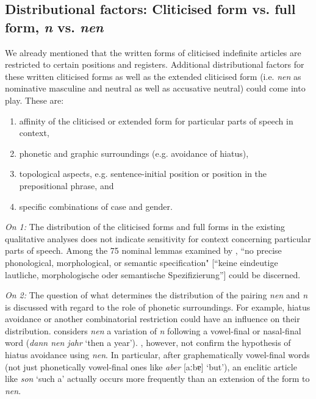 \subsection[Distributional factors]{Distributional factors: Cliticised form vs. full form, \textit{n} vs. \textit{nen}}
\label{subsec:14distributionalFactors}

We already mentioned that the written forms of cliticised indefinite articles are restricted to certain positions and registers.
Additional distributional factors for these written cliticised forms as well as the extended cliticised form (i.e. \textit{nen} as nominative masculine and neutral as well as accusative neutral) could come into play.
These are:

\begin{enumerate}
	\item affinity of the cliticised or extended form for particular parts of speech in context,
	\item phonetic and graphic surroundings (e.g. avoidance of hiatus),
	\item topological aspects, e.g. sentence-initial position or position in the prepositional phrase, and
	\item specific combinations of case and gender.
\end{enumerate}

\textit{On 1:}
The distribution of the cliticised forms and full forms in the existing qualitative analyses does not indicate sensitivity for context concerning particular parts of speech.
Among the 75 nominal lemmas examined by \citet[182]{Vogel2006}, ``no precise phonological, morphological, or semantic specification" [``keine eindeutige lautliche, morphologische oder semantische Spezifizierung''] could be discerned.

\textit{On 2:}
The question of what determines the distribution of the pairing \textit{nen} and \textit{n} is discussed with regard to the role of phonetic surroundings.
For example, hiatus avoidance or another combinatorial restriction could have an influence on their distribution.
\citet[7]{Burri2003} considers \textit{nen} a variation of \textit{n} following a vowel-final or nasal-final word (\textit{dann nen jahr} `then a year').
\citet[185]{Vogel2006}, however, not confirm the hypothesis of hiatus avoidance using \textit{nen}.
In particular, after graphematically vowel-final words (not just phonetically vowel-final ones like \textit{aber} [aːbɐ] `but'), an enclitic article like \textit{son} `such a' actually occurs more frequently than an extension of the form to \textit{nen}.

